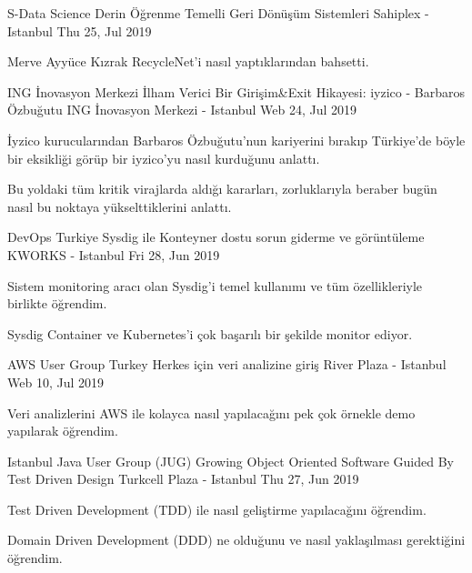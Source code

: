 \begin{cventries}
    \cventry
    {S-Data Science}
    {Derin Öğrenme Temelli Geri Dönüşüm Sistemleri}
    {Sahiplex - Istanbul}
    {Thu 25, Jul 2019}
    {
      \begin{cvitems}
        \item{Merve Ayyüce Kızrak RecycleNet'i nasıl yaptıklarından bahsetti.}
      \end{cvitems}
    }
    
    \cventry
    {ING İnovasyon Merkezi}
    {İlham Verici Bir Girişim\&Exit Hikayesi: iyzico - Barbaros Özbuğutu}
    {ING İnovasyon Merkezi - Istanbul}
    {Web 24, Jul 2019}
    {
      \begin{cvitems}
        \item{İyzico kurucularından Barbaros Özbuğutu'nun kariyerini bırakıp Türkiye'de böyle bir eksikliği görüp bir iyzico'yu nasıl kurduğunu anlattı.}
        \item{Bu yoldaki tüm kritik virajlarda aldığı kararları, zorluklarıyla beraber bugün nasıl bu noktaya yükselttiklerini anlattı.}
      \end{cvitems}
    }
    
    \cventry
    {DevOps Turkiye}
    {Sysdig ile Konteyner dostu sorun giderme ve görüntüleme}
    {KWORKS - Istanbul}
    {Fri 28, Jun 2019}
    {
      \begin{cvitems}
        \item{Sistem monitoring aracı olan Sysdig'i temel kullanımı ve tüm özellikleriyle birlikte öğrendim.}
        \item{Sysdig Container ve Kubernetes'i çok başarılı bir şekilde monitor ediyor.}
      \end{cvitems}
    }
    
    \cventry
    {AWS User Group Turkey}
    {Herkes için veri analizine giriş}
    {River Plaza - Istanbul}
    {Web 10, Jul 2019}
    {
      \begin{cvitems}
        \item{Veri analizlerini AWS ile kolayca nasıl yapılacağını pek çok örnekle demo yapılarak öğrendim.}
      \end{cvitems}
    }
    
    \cventry
    {Istanbul Java User Group (JUG)}
    {Growing Object Oriented Software Guided By Test Driven Design}
    {Turkcell Plaza - Istanbul}
    {Thu 27, Jun 2019}
    {
      \begin{cvitems}
        \item{Test Driven Development (TDD) ile nasıl geliştirme yapılacağını öğrendim.}
        \item{Domain Driven Development (DDD) ne olduğunu ve nasıl yaklaşılması gerektiğini öğrendim.}
      \end{cvitems}
    }
    

\end{cventries}
